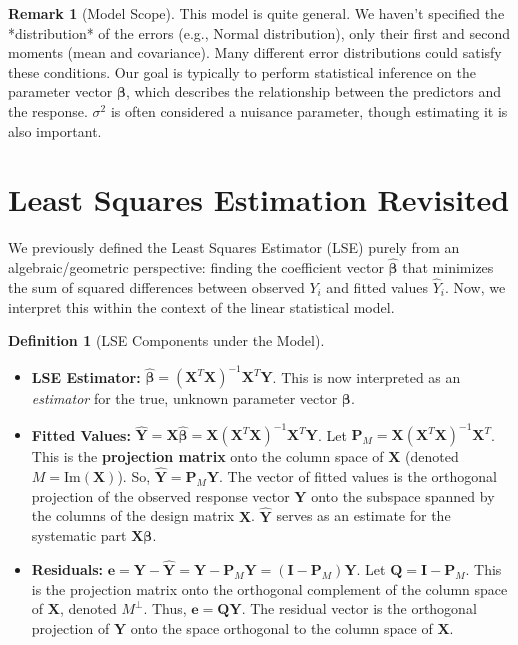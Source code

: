 \documentclass[11pt, letterpaper]{article}
\theoremstyle{definition}
\newtheorem{definition}[theorem]{Definition}
\newtheorem{remark}[theorem]{Remark}
\newcommand{\mat}[1]{\mathbf{#1}} %
\newcommand{\vect}[1]{\boldsymbol{#1}} %
\newcommand{\T}{^T} %
\begin{document}
\begin{remark}[Model Scope]
This model is quite general. We haven't specified the *distribution* of the errors (e.g., Normal distribution), only their first and second moments (mean and covariance). Many different error distributions could satisfy these conditions. Our goal is typically to perform statistical inference on the parameter vector $\vect{\beta}$, which describes the relationship between the predictors and the response. $\sigma^2$ is often considered a nuisance parameter, though estimating it is also important.
\end{remark}

\section{Least Squares Estimation Revisited}

We previously defined the Least Squares Estimator (LSE) purely from an algebraic/geometric perspective: finding the coefficient vector $\hat{\vect{\beta}}$ that minimizes the sum of squared differences between observed $Y_i$ and fitted values $\hat{Y}_i$. Now, we interpret this within the context of the linear statistical model.

\begin{definition}[LSE Components under the Model]
\begin{itemize}
    \item \textbf{LSE Estimator:} $\hat{\vect{\beta}} = (\mat{X}\T \mat{X})^{-1} \mat{X}\T \vect{Y}$.
    This is now interpreted as an \textit{estimator} for the true, unknown parameter vector $\vect{\beta}$.
    \item \textbf{Fitted Values:} $\hat{\vect{Y}} = \mat{X}\hat{\vect{\beta}} = \mat{X}(\mat{X}\T \mat{X})^{-1} \mat{X}\T \vect{Y}$.
    Let $\mat{P}_M = \mat{X}(\mat{X}\T \mat{X})^{-1} \mat{X}\T$. This is the \textbf{projection matrix} onto the column space of $\mat{X}$ (denoted $M = \text{Im}(\mat{X})$). So, $\hat{\vect{Y}} = \mat{P}_M \vect{Y}$. The vector of fitted values is the orthogonal projection of the observed response vector $\vect{Y}$ onto the subspace spanned by the columns of the design matrix $\mat{X}$. $\hat{\vect{Y}}$ serves as an estimate for the systematic part $\mat{X}\vect{\beta}$.
    \item \textbf{Residuals:} $\vect{e} = \vect{Y} - \hat{\vect{Y}} = \vect{Y} - \mat{P}_M \vect{Y} = (\mat{I} - \mat{P}_M)\vect{Y}$.
    Let $\mat{Q} = \mat{I} - \mat{P}_M$. This is the projection matrix onto the orthogonal complement of the column space of $\mat{X}$, denoted $M^\perp$. Thus, $\vect{e} = \mat{Q}\vect{Y}$. The residual vector is the orthogonal projection of $\vect{Y}$ onto the space orthogonal to the column space of $\mat{X}$.
\end{itemize}
\end{definition}
\end{document}
